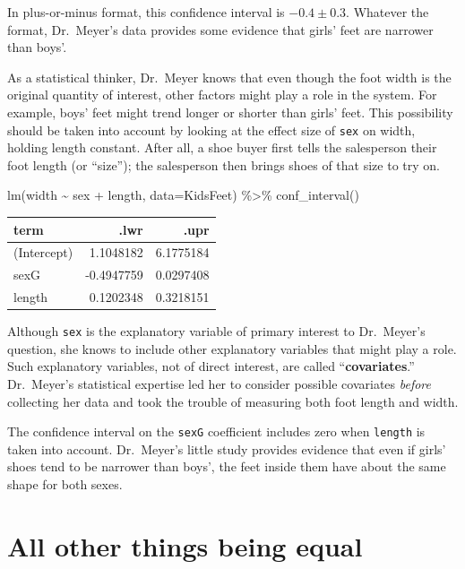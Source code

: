 \documentclass[
  letterpaper,
  DIV=11,
  numbers=noendperiod,
  oneside]{scrreprt}
\newenvironment{Shaded}{\begin{snugshade}}{\end{snugshade}}
\newcommand{\AttributeTok}[1]{\textcolor[rgb]{0.40,0.45,0.13}{#1}}
\newcommand{\FunctionTok}[1]{\textcolor[rgb]{0.28,0.35,0.67}{#1}}
\newcommand{\NormalTok}[1]{\textcolor[rgb]{0.00,0.23,0.31}{#1}}
\newcommand{\SpecialCharTok}[1]{\textcolor[rgb]{0.37,0.37,0.37}{#1}}
\begin{document}
In plus-or-minus format, this confidence interval is \(-0.4 \pm 0.3\).
Whatever the format, Dr.~Meyer's data provides some evidence that girls'
feet are narrower than boys'.

As a statistical thinker, Dr.~Meyer knows that even though the foot
width is the original quantity of interest, other factors might play a
role in the system. For example, boys' feet might trend longer or
shorter than girls' feet. This possibility should be taken into account
by looking at the effect size of \texttt{sex} on width, holding length
constant. After all, a shoe buyer first tells the salesperson their foot
length (or ``size''); the salesperson then brings shoes of that size to
try on.

\begin{Shaded}
\begin{Highlighting}[]
\FunctionTok{lm}\NormalTok{(width }\SpecialCharTok{\textasciitilde{}}\NormalTok{ sex }\SpecialCharTok{+}\NormalTok{ length, }\AttributeTok{data=}\NormalTok{KidsFeet) }\SpecialCharTok{\%\textgreater{}\%} \FunctionTok{conf\_interval}\NormalTok{()}
\end{Highlighting}
\end{Shaded}

\ttfamily 
\begin{tabular}{lrr}
\toprule
term & .lwr & .upr\\
\midrule
(Intercept) & 1.1048182 & 6.1775184\\
sexG & -0.4947759 & 0.0297408\\
length & 0.1202348 & 0.3218151\\
\bottomrule
\end{tabular} \normalfont
\bigskip

Although \texttt{sex} is the explanatory variable of primary interest to
Dr.~Meyer's question, she knows to include other explanatory variables
that might play a role. Such explanatory variables, not of direct
interest, are called ``\textbf{covariates}.'' Dr.~Meyer's statistical
expertise led her to consider possible covariates \emph{before}
collecting her data and took the trouble of measuring both foot length
and width.

The confidence interval on the \texttt{sexG} coefficient includes zero
when \texttt{length} is taken into account. Dr.~Meyer's little study
provides evidence that even if girls' shoes tend to be narrower than
boys', the feet inside them have about the same shape for both sexes.

\hypertarget{all-other-things-being-equal}{%
\section{All other things being
equal}\label{all-other-things-being-equal}}
\end{document}
